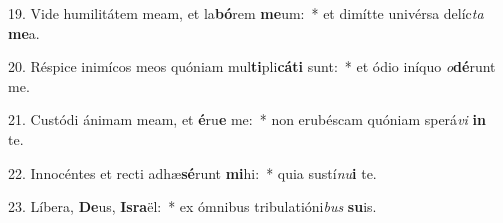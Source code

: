 19. Vide humilitátem meam, et la\textbf{bó}rem \textbf{me}um:~*  et dimítte univérsa delíc\textit{ta} \textbf{me}a.\

20. Réspice inimícos meos quóniam mul\textbf{ti}pli\textbf{cá}\textbf{ti} sunt:~*  et ódio iníquo \textit{o}\textbf{dé}runt me.\

21. Custódi ánimam meam, et \textbf{é}ru\textbf{e} me:~*  non erubéscam quóniam sperá\textit{vi} \textbf{in} te.\

22. Innocéntes et recti adhæ\textbf{sé}runt \textbf{mi}hi:~*  quia sustí\textit{nu}\textbf{i} te.\

23. Líbera, \textbf{De}us, \textbf{Is}\textbf{ra}ël:~*  ex ómnibus tribulatióni\textit{bus} \textbf{su}is.\

